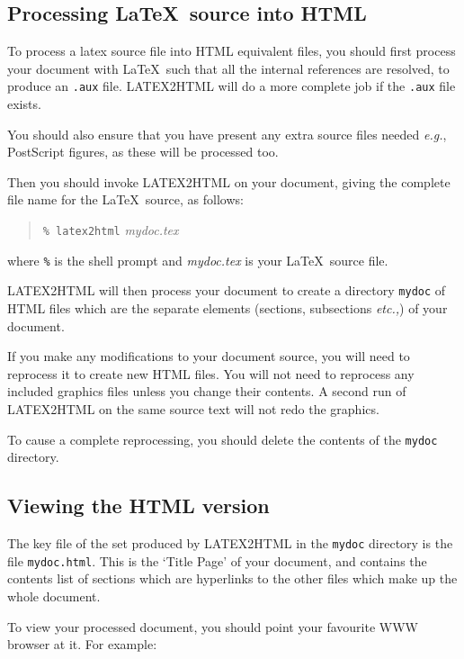 \documentclass[twoside,11pt,nolof]{starlink}
\begin{document}
\subsection{Processing \LaTeX\ source into HTML}

To process a latex source file into HTML equivalent files, you should first
process your document with \LaTeX\ such that all the internal references are
resolved, to produce an \texttt{.aux} file.  LATEX2HTML will do a more complete
job if the \texttt{.aux} file exists.

You should also ensure that you have present any extra source files needed
\emph{e.g.}, PostScript figures, as these will be processed too.

Then you should invoke LATEX2HTML on your document, giving the complete file
name for the \LaTeX\ source, as follows:

\begin{quote}
\texttt{\% latex2html} \textit{mydoc.tex}
\end{quote}

where \texttt{\%} is the shell prompt and \textit{mydoc.tex} is your
\LaTeX\ source file.

LATEX2HTML will then process your document to create a directory \texttt{mydoc}
of HTML files which are the separate elements (sections, subsections
\emph{etc.,}) of your document.

If you make any modifications to your document source, you will need to
reprocess it to create new HTML files.  You will not need to reprocess
any included graphics files unless you change their contents.  A second
run of LATEX2HTML on the same source text will not redo the graphics.

To cause a complete reprocessing, you should delete the contents of the
\texttt{mydoc} directory.

\subsection{Viewing the HTML version}

The key file of the set produced by LATEX2HTML in the \texttt{mydoc}
directory is the file \texttt{mydoc.html}.  This is the `Title Page' of
your document, and contains the contents list of sections which are
hyperlinks to the other files which make up the whole document.

To view your processed document, you should point your favourite WWW
browser at it.  For example:
\end{document}
